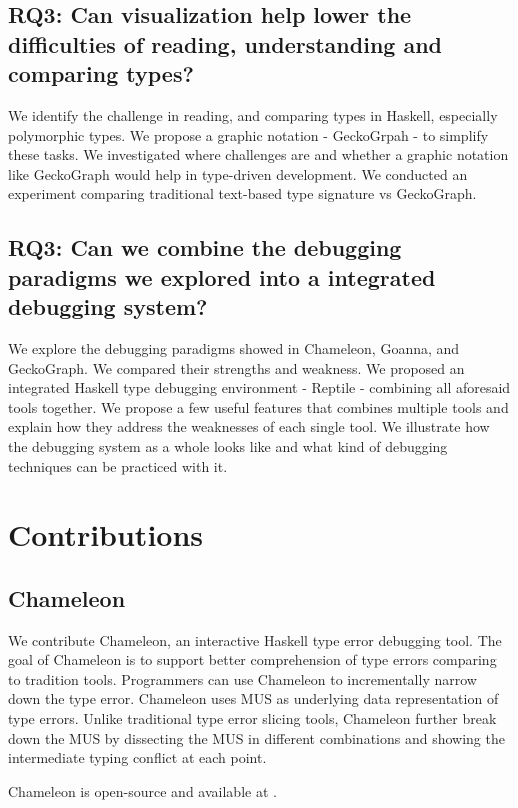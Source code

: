 \subsection{RQ3: Can visualization help lower the difficulties of reading, understanding and comparing types?}

We identify the challenge in reading, and comparing types in Haskell, especially polymorphic types. We propose a graphic notation - GeckoGrpah - to simplify these tasks. We investigated where challenges are and whether a graphic notation like GeckoGraph would help in type-driven development. We conducted an experiment comparing traditional text-based type signature vs GeckoGraph. 

\subsection{RQ3: Can we combine the debugging paradigms we explored into a integrated debugging system?}

We explore the debugging paradigms showed in Chameleon, Goanna, and GeckoGraph. We compared their strengths and weakness. We proposed an integrated Haskell type debugging environment - Reptile - combining all aforesaid tools together. We propose a few useful features that combines multiple tools and explain how they address the weaknesses of each single tool. We illustrate how the debugging system as a whole looks like and what kind of debugging techniques can be practiced with it. 

\section{Contributions}  \label{sec:contributions}

\subsection{Chameleon}
We contribute Chameleon, an interactive Haskell type error debugging tool. The goal of Chameleon is to support better comprehension of type errors comparing to tradition tools.  Programmers can use Chameleon to incrementally narrow down the type error. Chameleon uses MUS as underlying data representation of type errors. Unlike traditional type error slicing tools, Chameleon further break down the MUS by dissecting the MUS in different combinations and showing the intermediate typing conflict at each point.


Chameleon is open-source and available at \cite{Anonymous2022-xp}. 

